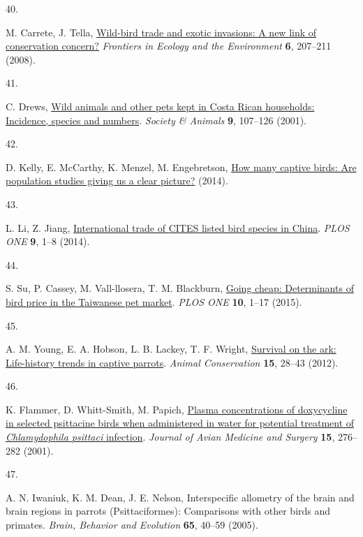 \documentclass[
  man,floatsintext]{apa6}
\newlength{\cslhangindent}
\newlength{\csllabelwidth}
\newlength{\cslentryspacingunit} %
\newenvironment{CSLReferences}[2] %
 {%
  \setlength{\parindent}{0pt}
  \ifodd #1
  \let\oldpar\par
  \def\par{\hangindent=\cslhangindent\oldpar}
  \fi
  \setlength{\parskip}{#2\cslentryspacingunit}
 }%
 {}
\newcommand{\CSLLeftMargin}[1]{\parbox[t]{\csllabelwidth}{#1}}
\newcommand{\CSLRightInline}[1]{\parbox[t]{\linewidth - \csllabelwidth}{#1}\break}
\begin{document}
\begin{CSLReferences}{0}{0}
\leavevmode{}%
\CSLLeftMargin{40. }%
\CSLRightInline{M. Carrete, J. Tella, \href{https://doi.org/10.1890/070075}{Wild-bird trade and exotic invasions: A new link of conservation concern?} \emph{Frontiers in Ecology and the Environment} \textbf{6}, 207--211 (2008).}

\leavevmode{}%
\CSLLeftMargin{41. }%
\CSLRightInline{C. Drews, \href{https://doi.org/10.1163/156853001753639233}{Wild animals and other pets kept in {C}osta {R}ican households: Incidence, species and numbers}. \emph{Society \& Animals} \textbf{9}, 107--126 (2001).}

\leavevmode{}%
\CSLLeftMargin{42. }%
\CSLRightInline{D. Kelly, E. McCarthy, K. Menzel, M. Engebretson, \href{https://www.avianwelfare.org/issues/overview.htm}{How many captive birds: Are population studies giving us a clear picture?} (2014).}

\leavevmode{}%
\CSLLeftMargin{43. }%
\CSLRightInline{L. Li, Z. Jiang, \href{https://doi.org/10.1371/journal.pone.0085012}{International trade of {CITES} listed bird species in {C}hina}. \emph{PLOS ONE} \textbf{9}, 1--8 (2014).}

\leavevmode{}%
\CSLLeftMargin{44. }%
\CSLRightInline{S. Su, P. Cassey, M. Vall-llosera, T. M. Blackburn, \href{https://doi.org/10.1371/journal.pone.0127482}{Going cheap: Determinants of bird price in the {T}aiwanese pet market}. \emph{PLOS ONE} \textbf{10}, 1--17 (2015).}

\leavevmode{}%
\CSLLeftMargin{45. }%
\CSLRightInline{A. M. Young, E. A. Hobson, L. B. Lackey, T. F. Wright, \href{https://doi.org/10.1111/j.1469-1795.2011.00477.x}{Survival on the ark: Life-history trends in captive parrots}. \emph{Animal Conservation} \textbf{15}, 28--43 (2012).}

\leavevmode{}%
\CSLLeftMargin{46. }%
\CSLRightInline{K. Flammer, D. Whitt-Smith, M. Papich, \href{https://doi.org/10.1647/1082-6742(2001)015\%5B0276:PCODIS\%5D2.0.CO;2}{Plasma concentrations of doxycycline in selected psittacine birds when administered in water for potential treatment of \emph{{C}hlamydophila psittaci} infection}. \emph{Journal of Avian Medicine and Surgery} \textbf{15}, 276--282 (2001).}

\leavevmode{}%
\CSLLeftMargin{47. }%
\CSLRightInline{A. N. Iwaniuk, K. M. Dean, J. E. Nelson, Interspecific allometry of the brain and brain regions in parrots ({P}sittaciformes): Comparisons with other birds and primates. \emph{Brain, Behavior and Evolution} \textbf{65}, 40--59 (2005).}


\end{CSLReferences}
\end{document}
